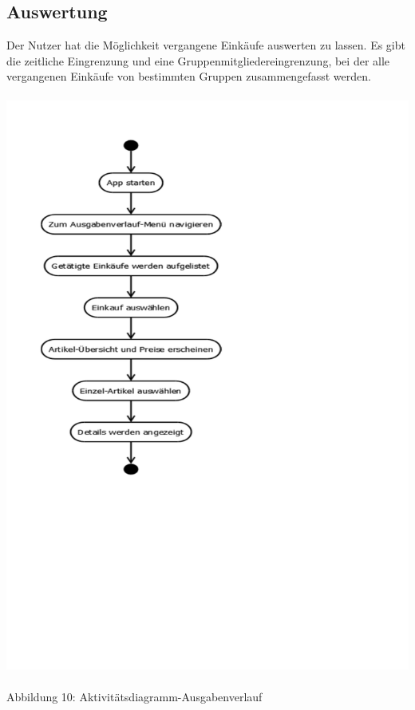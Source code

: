 \documentclass[12pt,a4paper]{article}
\begin{document}
\subsection{Auswertung}
Der Nutzer hat die Möglichkeit vergangene Einkäufe auswerten zu lassen. Es gibt die zeitliche Eingrenzung und eine Gruppenmitgliedereingrenzung, bei der alle vergangenen Einkäufe von bestimmten Gruppen zusammengefasst werden.
\\
\\
\hspace*{-10mm} 
\includegraphics[trim = 17mm 130mm 0mm 20mm, clip, scale=0.9]{Aktiv-Ausgabe.pdf}
\\
\\
\footnotesize Abbildung 10: Aktivitätsdiagramm-Ausgabenverlauf
\normalsize
\\
\newpage
\end{document}
